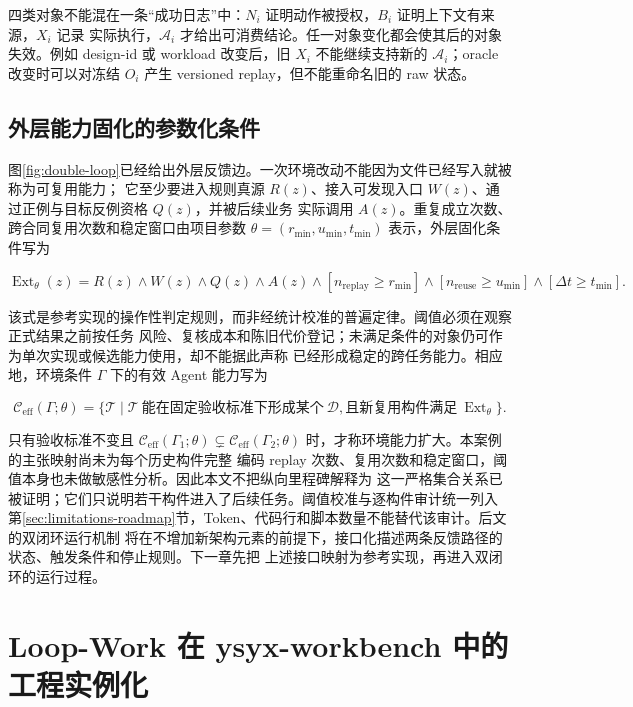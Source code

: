 \documentclass[UTF8,a4paper,zihao=-4,oneside]{ctexart}
\begin{document}
四类对象不能混在一条“成功日志”中：$N_i$ 证明动作被授权，$B_i$ 证明上下文有来源，$X_i$ 记录
实际执行，$\mathcal{A}_i$ 才给出可消费结论。任一对象变化都会使其后的对象失效。例如 design-id 或
workload 改变后，旧 $X_i$ 不能继续支持新的 $\mathcal{A}_i$；oracle 改变时可以对冻结 $O_i$ 产生
versioned replay，但不能重命名旧的 raw 状态。

\subsection{外层能力固化的参数化条件}

图\ref{fig:double-loop}已经给出外层反馈边。一次环境改动不能因为文件已经写入就被称为可复用能力；
它至少要进入规则真源 $R(z)$、接入可发现入口 $W(z)$、通过正例与目标反例资格 $Q(z)$，并被后续业务
实际调用 $A(z)$。重复成立次数、跨合同复用次数和稳定窗口由项目参数
$\theta=(r_{\min},u_{\min},t_{\min})$ 表示，外层固化条件写为

\[
\operatorname{Ext}_{\theta}(z)=R(z)\land W(z)\land Q(z)\land A(z)
\land[n_{\mathrm{replay}}\ge r_{\min}]
\land[n_{\mathrm{reuse}}\ge u_{\min}]
\land[\Delta t\ge t_{\min}].
\]

该式是参考实现的操作性判定规则，而非经统计校准的普遍定律。阈值必须在观察正式结果之前按任务
风险、复核成本和陈旧代价登记；未满足条件的对象仍可作为单次实现或候选能力使用，却不能据此声称
已经形成稳定的跨任务能力。相应地，环境条件 $\Gamma$ 下的有效 Agent 能力写为

\[
\mathcal{C}_{\mathrm{eff}}(\Gamma;\theta)=
\{\mathcal{T}\mid\mathcal{T}\ \text{能在固定验收标准下形成某个}\ \mathcal{D},
\text{且新复用构件满足}\ \operatorname{Ext}_{\theta}\}.
\]

只有验收标准不变且
$\mathcal{C}_{\mathrm{eff}}(\Gamma_1;\theta)\subsetneq
\mathcal{C}_{\mathrm{eff}}(\Gamma_2;\theta)$ 时，才称环境能力扩大。本案例的主张映射尚未为每个历史构件完整
编码 replay 次数、复用次数和稳定窗口，阈值本身也未做敏感性分析。因此本文不把纵向里程碑解释为
这一严格集合关系已被证明；它们只说明若干构件进入了后续任务。阈值校准与逐构件审计统一列入
第\ref{sec:limitations-roadmap}节，Token、代码行和脚本数量不能替代该审计。后文的双闭环运行机制
将在不增加新架构元素的前提下，接口化描述两条反馈路径的状态、触发条件和停止规则。下一章先把
上述接口映射为参考实现，再进入双闭环的运行过程。

\section{Loop-Work 在 ysyx-workbench 中的工程实例化}
\label{sec:engineering-instantiation}
\end{document}
